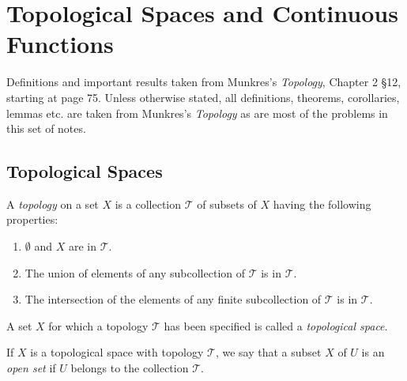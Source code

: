 \chapter{Topological Spaces and Continuous Functions}

Definitions and important results taken from Munkres's
\emph{Topology}, Chapter 2 \S 12, starting at page 75. Unless
otherwise stated, all definitions, theorems, corollaries, lemmas
etc. are taken from Munkres's \emph{Topology} as are most of the
problems in this set of notes.
\section{Topological Spaces}
\begin{definition}
  A \emph{topology} on a set $X$ is a collection $\mathcal{T}$ of
  subsets of $X$ having the following properties:
  \begin{enumerate}[(1)]
  \item $\emptyset$ and $X$ are in $\mathcal{T}$.
  \item The union of elements of any subcollection of
    $\mathcal{T}$ is in $\mathcal{T}$.
  \item The intersection of the elements of any finite
    subcollection of $\mathcal{T}$ is in
    $\mathcal{T}$.
  \end{enumerate}
  A set $X$ for which a topology $\mathcal{T}$ has been specified
  is called a \emph{topological space}.
\end{definition}

If $X$ is a topological space with topology $\mathcal{T}$, we say
that a subset $X$ of $U$ is an \emph{open set} if $U$ belongs to
the collection $\mathcal{T}$.

